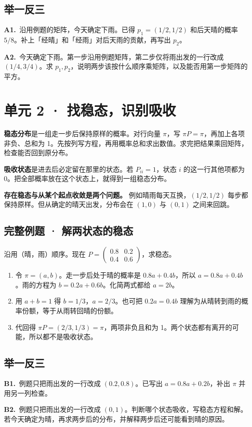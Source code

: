 \documentclass[UTF8,a4paper,11pt]{ctexart}
\newcommand{\PracticeQuestion}[3]{\par\Needspace{4\baselineskip}\noindent\begin{minipage}{\linewidth}\textbf{#1.}\ #2\par\noindent\rule{0pt}{#3mm}\par\end{minipage}\par}
\begin{document}
\subsection{举一反三}
\PracticeQuestion{A1}{沿用例题的矩阵，今天确定下雨。已得 $p_1=(1/2,1/2)$ 和后天晴的概率 $5/8$。补上「经晴」和「经雨」对后天雨的贡献，再写出 $p_2$。}{23}
\PracticeQuestion{A2}{今天确定下雨。第一步沿用例题矩阵，第二步仅将雨出发的一行改成 $(1/4,3/4)$。求 $p_1,p_2$，说明两步该按什么顺序乘矩阵，以及能否用第一步矩阵的平方。}{26}
\clearpage
\section{单元 2 · 找稳态，识别吸收}
\textbf{稳态分布}是一组走一步后保持原样的概率。对行向量 $\pi$，写 $\pi P=\pi$，再加上各项非负、总和为 1。先按列写方程，再用概率总和求出数值。求完把结果乘回矩阵，检查能否回到原分布。

\textbf{吸收状态}是进去后必定留在那里的状态。若 $P_{ii}=1$，状态 $i$ 的这一行其他项都为 0。把全部概率放在这个状态上，就得到一组稳态分布。

\textbf{存在稳态与从某个起点收敛是两个问题。} 例如晴雨每天互换，$(1/2,1/2)$ 每步都保持原样。但从确定的晴天出发，分布会在 $(1,0)$ 与 $(0,1)$ 之间来回跳。

\subsection{完整例题 · 解两状态的稳态}
沿用（晴，雨）顺序。现在 $P=\begin{pmatrix}0.8&0.2\\0.4&0.6\end{pmatrix}$，求稳态。

\begin{enumerate}
\item 令 $\pi=(a,b)$。走一步后处于晴的概率是 $0.8a+0.4b$，所以 $a=0.8a+0.4b$。雨的方程为 $b=0.2a+0.6b$。化简两式都给 $a=2b$。
\item 用 $a+b=1$ 得 $b=1/3$，$a=2/3$。也可把 $0.2a=0.4b$ 理解为从晴转到雨的概率份额，等于从雨转回晴的份额。
\item 代回得 $\pi P=(2/3,1/3)=\pi$，两项非负且和为 1。两个状态都有离开的可能，所以都不是吸收状态。
\end{enumerate}
\subsection{举一反三}
\PracticeQuestion{B1}{例题只把雨出发的一行改成 $(0.2,0.8)$。已写出 $a=0.8a+0.2b$，补出 $\pi$ 并用另一列检查。}{24}
\PracticeQuestion{B2}{例题只把雨出发的一行改成 $(0,1)$。判断哪个状态吸收，写稳态方程和解。若今天确定为晴，再求两步后的分布，并解释两步后还可能看到晴的原因。}{34}
\clearpage
\end{document}
